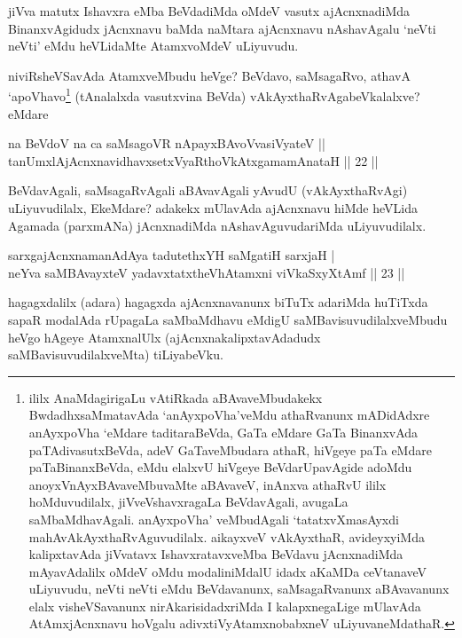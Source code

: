 \begin{artha}
jiVva matutx Ishavxra eMba BeVdadiMda oMdeV vasutx ajAcnxnadiMda BinanxvAgidudx jAcnxnavu baMda naMtara ajAcnxnavu nAshavAgalu `neVti neVti' eMdu heVLidaMte AtamxvoMdeV uLiyuvudu. 

niviRsheVSavAda AtamxveMbudu heVge? BeVdavo, saMsagaRvo, athavA `apoVhavo\footnote{ililx AnaMdagirigaLu vAtiRkada aBAvaveMbudakekx BwdadhxsaMmatavAda `anAyxpoVha'veMdu athaRvanunx mADidAdxre anAyxpoVha `eMdare taditaraBeVda, GaTa eMdare GaTa BinanxvAda paTAdivasutxBeVda, adeV GaTaveMbudara athaR, hiVgeye paTa eMdare paTaBinanxBeVda, eMdu elalxvU hiVgeye BeVdarUpavAgide adoMdu anoyxVnAyxBAvaveMbuvaMte aBAvaveV, inAnxva athaRvU ililx hoMduvudilalx, jiVveVshavxragaLa BeVdavAgali, avugaLa saMbaMdhavAgali. anAyxpoVha' veMbudAgali `tatatxvXmasAyxdi mahAvAkAyxthaRvAguvudilalx. aikayxveV vAkAyxthaR, avideyxyiMda kalipxtavAda jiVvatavx IshavxratavxveMba BeVdavu jAcnxnadiMda mAyavAdalilx oMdeV oMdu modaliniMdalU idadx aKaMDa ceVtanaveV uLiyuvudu, neVti neVti eMdu BeVdavanunx, saMsagaRvanunx aBAvavanunx elalx visheVSavanunx nirAkarisidadxriMda I kalapxnegaLige mUlavAda AtAmxjAcnxnavu hoVgalu adivxtiVyAtamxnobabxneV uLiyuvaneMdathaR.} (tAnalalxda vasutxvina BeVda) vAkAyxthaRvAgabeVkalalxve? eMdare \mdash 
\end{artha}

\begin{shl}
na BeVdoV na ca saMsagoVR nApayxBAvoV\s vasiVyateV ||  \\
tanUmxlAjAcnxnavidhavxsetxVyaRthoVkAtxgamamAnataH \hfill||  22 || 
\end{shl}

\begin{artha}
BeVdavAgali, saMsagaRvAgali aBAvavAgali yAvudU (vAkAyxthaRvAgi) uLiyuvudilalx, EkeMdare? adakekx mUlavAda ajAcnxnavu hiMde heVLida Agamada (parxmANa) jAcnxnadiMda nAshavAguvudariMda uLiyuvudilalx.
\end{artha}



\begin{shl}
sarxgajAcnxnamanAdAya tadutethxYH saMgatiH sarxjaH  | \\
neYva saMBAvayxteV yadavxtatxtheVhA\s \s tamxni viVkaSxyXtAmf \hfill||  23 ||  
\end{shl}

\begin{artha}
hagagxdalilx (adara) hagagxda ajAcnxnavanunx biTuTx adariMda huTiTxda sapaR modalAda rUpagaLa saMbaMdhavu eMdigU saMBavisuvudilalxveMbudu heVgo hAgeye AtamxnalUlx (ajAcnxnakalipxtavAdadudx saMBavisuvudilalxveMta) tiLiyabeVku.
\end{artha}

